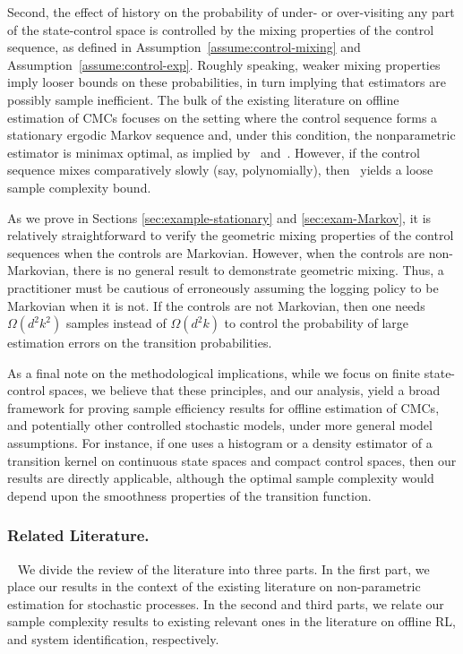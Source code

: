 \documentclass[opre,sglanonrev]{informs4}
\numberwithin{equation}{section}
\begin{document}
{Second, the effect of history on the probability of under- or over-visiting any part of the state-control space is controlled by the mixing properties of the control sequence, as defined in Assumption~\ref{assume:control-mixing} and Assumption~\ref{assume:control-exp}. 
Roughly speaking, weaker mixing properties imply looser bounds on these probabilities, in turn implying that estimators are possibly sample inefficient. 
The bulk of the existing literature on offline estimation of CMCs focuses on the setting where the control sequence forms a stationary ergodic Markov sequence and, under this condition, the nonparametric estimator is minimax optimal, as implied by~ and~. 
However, if the control sequence mixes comparatively slowly (say, polynomially), then~ yields a loose sample complexity bound. 

As we prove in Sections \ref{sec:example-stationary} and \ref{sec:exam-Markov},  it is relatively straightforward to verify the geometric mixing properties of the control sequences when the controls are Markovian. 
However, when the controls are non-Markovian, there is no general result to demonstrate geometric mixing. Thus, a practitioner must be cautious of erroneously assuming the logging policy to be Markovian when it is not. 
If the controls are not Markovian, then one needs $\Omega(d^2k^2)$ samples instead of $\Omega(d^2k)$ to control the probability of large estimation errors on the transition probabilities. 

As a final note on the methodological implications, while we focus on finite state-control spaces, we believe that these principles, and our analysis, yield a broad framework for proving sample efficiency results for offline estimation of CMCs, and potentially other controlled stochastic models, under more general  model assumptions. For instance, if one uses a histogram or a density estimator of a transition kernel on continuous state spaces and compact control spaces, then our results are directly applicable, although the optimal sample complexity would depend upon the smoothness properties of the transition function. 

\subsubsection*{Related Literature.}~\label{sec:literature-review}
We divide the review of the literature into three parts. In the first part, we place our results in the context of the existing literature on non-parametric estimation for stochastic processes. In the second and third parts, we relate our sample complexity results to existing relevant ones in the literature on offline RL, and system identification, respectively.

}
\end{document}
